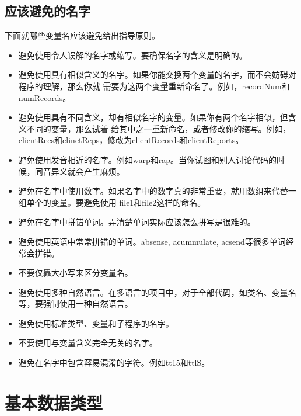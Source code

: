 \documentclass{article}
\begin{document}
\subsection{应该避免的名字}
下面就哪些变量名应该避免给出指导原则。
\begin{itemize}
    \item 避免使用令人误解的名字或缩写。要确保名字的含义是明确的。
    \item 避免使用具有相似含义的名字。如果你能交换两个变量的名字，而不会妨碍对程序的理解，那么你就
    需要为这两个变量重新命名了。例如，recordNum和numRecords。
    \item 避免使用具有不同含义，却有相似名字的变量。如果你有两个名字相似，但含义不同的变量，那么试着
    给其中之一重新命名，或者修改你的缩写。例如，clientRecs和clinetReps，修改为clientRecords和clientReports。
    \item 避免使用发音相近的名字。例如warp和rap。当你试图和别人讨论代码的时候，同音异义就会产生麻烦。
    \item 避免在名字中使用数字。如果名字中的数字真的非常重要，就用数组来代替一组单个的变量。要避免使用
    file1和file2这样的命名。
    \item 避免在名字中拼错单词。弄清楚单词实际应该怎么拼写是很难的。
    \item 避免使用英语中常常拼错的单词。absense, acummulate, acsend等很多单词经常会拼错。
    \item 不要仅靠大小写来区分变量名。
    \item 避免使用多种自然语言。在多语言的项目中，对于全部代码，如类名、变量名等，要强制使用一种自然语言。
    \item 避免使用标准类型、变量和子程序的名字。
    \item 不要使用与变量含义完全无关的名字。
    \item 避免在名字中包含容易混淆的字符。例如tt15和ttlS。
\end{itemize}

\section{基本数据类型}
\end{document}
